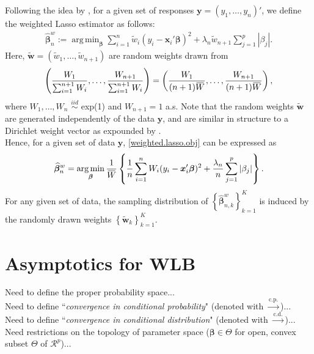 \documentclass[12pt]{article}
\DeclareMathOperator*{\argmin}{arg\,min} %
\newcommand{\bnw}{\widehat{\bm{\beta}}_n^w} %
\newcommand{\be}{\bm{\beta}} %
\newcommand{\sumin}{\sum_{i=1}^n} %
\newcommand{\dn}{\dfrac{1}{n}} %
\newcommand{\CONV}[1]{\stackrel{\text{#1}}{\longrightarrow}} %
\newcommand{\overbar}[1]{\mkern 2mu\overline{\mkern-2mu#1\mkern-2mu}\mkern 2mu}
\newcommand{\x}{\bm{x}_i} %
\begin{document}
Following the idea by \citet{Newton&Raftery}, for a given set of responses $\bm{y} = (y_1, \ldots, y_n)'$, we define the weighted Lasso estimator as follows:
	\begin{align} \label{weighted.lasso.obj}   
	\bnw := \argmin_{\be} 
			\sumin \widetilde{w}_i ( y_i - \x' \be )^2 
			+ \lambda_n \widetilde{w}_{n+1} \sum_{j=1}^p |\beta_j|.
	\end{align}
\noindent Here, $\widetilde{\bm{w}} = ( \widetilde{w}_1, \ldots, \widetilde{w}_{n+1} )$ are random weights drawn from
	\begin{align*}
	\left(
		\dfrac{W_1}{ \sum_{i=1}^{n+1} W_i}
		, \ldots, 
		\dfrac{ W_{n+1} }{ \sum_{i=1}^{n+1} W_i}
	\right)
	= 
	\left(
		\dfrac{W_1}{ (n+1) \overbar{W} }
		, \ldots, 
		\dfrac{ W_{n+1} }{ (n+1) \overbar{W} }
	\right),
	\end{align*} 
\noindent where $W_1, \ldots, W_n$ $\stackrel{iid}{\sim}$ exp(1) and $W_{n+1} = 1$ a.s. Note that the random weights $\widetilde{\bm{w}}$ are generated independently of the data $\bm{y}$, and are similar in structure to a Dirichlet weight vector as expounded by \citet{Newton&Raftery}. \\

Hence, for a given set of data $\bm{y}$, \eqref{weighted.lasso.obj} can be expressed as
	\begin{align} \label{weighted.lasso.obj2}   
	\bnw = \argmin_{\be}
			\dfrac{1}{\overbar{W}}
			\left\{
				\dn \sumin W_i ( y_i - \x' \be )^2 
				+ \dfrac{\lambda_n}{n} \sum_{j=1}^p |\beta_j|
			\right\}. 
	\end{align}
For any given set of data, the sampling distribution of $\left\{ \widehat{\be}^w_{n,k} \right\}^K_{k=1}$ is induced by the randomly drawn weights $\left\{ \widetilde{\bm{w}}_k \right\}^K_{k=1}$.         	  	  


\section{Asymptotics for WLB}

Need to define the proper probability space... \\
Need to define ``\textit{convergence in conditional probability}" (denoted with $\CONV{c.p.}$)... \\
Need to define ``\textit{convergence in conditional distribution}" (denoted with $\CONV{c.d.}$)... \\
Need restrictions on the topology of parameter space ($\be \in \Theta$ for open, convex subset $\Theta$ of $\mathcal{R}^p$)... \\             
\end{document}
